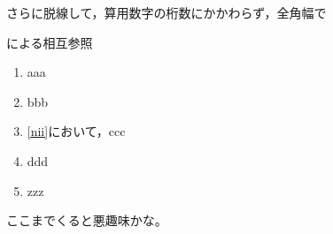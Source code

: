 \documentclass[a4j]{jarticle}
\begin{document}
さらに脱線して，算用数字の桁数にかかわらず，全角幅で

\begin{showEx}{による相互参照}
\let\maru\ajarabic
\begin{enumerate}<syokiti=7>[m]
  \item aaa
  \item \label{nii}bbb
  \item \ref{nii}において，ccc
  \item ddd
\setcounter{enumi}{122}
  \item zzz
\end{enumerate}
\end{showEx}

ここまでくると悪趣味かな。
\end{document}
